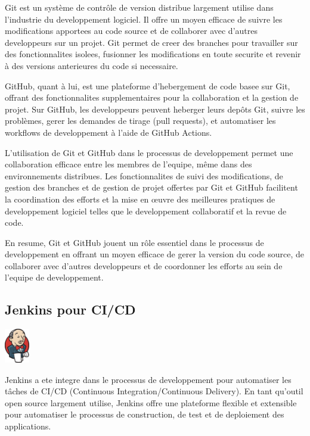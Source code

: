 \documentclass[a4paper, 11pt, openany]{report}
\begin{document}
Git est un système de contrôle de version distribue largement utilise dans l'industrie du developpement logiciel. Il offre un moyen efficace de suivre les modifications apportees au code source et de collaborer avec d'autres developpeurs sur un projet. Git permet de creer des branches pour travailler sur des fonctionnalites isolees, fusionner les modifications en toute securite et revenir à des versions anterieures du code si necessaire.

GitHub, quant à lui, est une plateforme d'hebergement de code basee sur Git, offrant des fonctionnalites supplementaires pour la collaboration et la gestion de projet. Sur GitHub, les developpeurs peuvent heberger leurs depôts Git, suivre les problèmes, gerer les demandes de tirage (pull requests), et automatiser les workflows de developpement à l'aide de GitHub Actions.

L'utilisation de Git et GitHub dans le processus de developpement permet une collaboration efficace entre les membres de l'equipe, même dans des environnements distribues. Les fonctionnalites de suivi des modifications, de gestion des branches et de gestion de projet offertes par Git et GitHub facilitent la coordination des efforts et la mise en œuvre des meilleures pratiques de developpement logiciel telles que le developpement collaboratif et la revue de code.

En resume, Git et GitHub jouent un rôle essentiel dans le processus de developpement en offrant un moyen efficace de gerer la version du code source, de collaborer avec d'autres developpeurs et de coordonner les efforts au sein de l'equipe de developpement.


\subsection{Jenkins pour CI/CD}
\begin{center}
\includegraphics[height=1.5cm]{jenkins.png}
\end{center}

Jenkins a ete integre dans le processus de developpement pour automatiser les tâches de CI/CD (Continuous Integration/Continuous Delivery). En tant qu'outil open source largement utilise, Jenkins offre une plateforme flexible et extensible pour automatiser le processus de construction, de test et de deploiement des applications.
\end{document}
